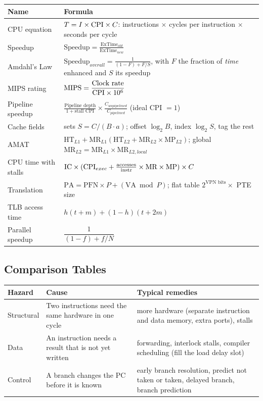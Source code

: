 \begin{center}
\renewcommand{\arraystretch}{1.5}
\begin{tabular}{@{}p{3.6cm}p{9.4cm}@{}}
\toprule
Name & Formula \\
\midrule
CPU equation &
$T=I\times\mathrm{CPI}\times C$: instructions $\times$ cycles per instruction
$\times$ seconds per cycle \\
Speedup &
$\displaystyle \text{Speedup}=\frac{\text{ExTime}_{old}}{\text{ExTime}_{new}}$ \\
Amdahl's Law &
$\displaystyle \text{Speedup}_{overall}=\frac{1}{(1-F)+F/S}$,
with $F$ the fraction of \emph{time} enhanced and $S$ its speedup \\
MIPS rating &
$\displaystyle \text{MIPS}=\frac{\text{Clock rate}}{\mathrm{CPI}\times10^{6}}$ \\
Pipeline speedup &
$\displaystyle \frac{\text{Pipeline depth}}{1+\text{stall CPI}}\times
\frac{C_{unpipelined}}{C_{pipelined}}$ (ideal CPI $=1$) \\
Cache fields &
sets $S=C/(B\cdot a)$; offset $\log_2B$, index $\log_2S$, tag the rest \\
AMAT &
$\text{HT}_{L1}+\text{MR}_{L1}(\text{HT}_{L2}+\text{MR}_{L2}\times\text{MP}_{L2})$;
global $\text{MR}_{L2}=\text{MR}_{L1}\times\text{MR}_{L2,local}$ \\
CPU time with stalls &
$\text{IC}\times(\mathrm{CPI}_{exec}+\frac{\text{accesses}}{\text{instr}}\times\text{MR}\times\text{MP})\times C$ \\
Translation &
$\text{PA}=\text{PFN}\times P+(\text{VA}\bmod P)$; flat table
$2^{\text{VPN bits}}\times$ PTE size \\
TLB access time &
$h(t+m)+(1-h)(t+2m)$ \\
Parallel speedup &
$\dfrac{1}{(1-f)+f/N}$ \\
\bottomrule
\end{tabular}
\end{center}

\subsection{Comparison Tables}

\begin{center}
\begin{tabular}{@{}lp{4.4cm}p{6.2cm}@{}}
\toprule
Hazard & Cause & Typical remedies \\
\midrule
Structural & Two instructions need the same hardware in one cycle &
more hardware (separate instruction and data memory, extra ports), stalls \\
Data & An instruction needs a result that is not yet written &
forwarding, interlock stalls, compiler scheduling (fill the load delay slot) \\
Control & A branch changes the PC before it is known &
early branch resolution, predict not taken or taken, delayed branch, branch
prediction \\
\bottomrule
\end{tabular}
\end{center}

